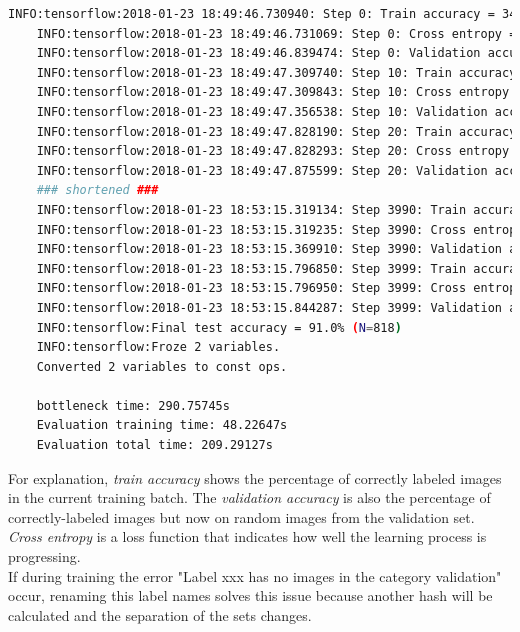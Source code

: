 \begin{minipage}{\linewidth}
\begin{lstlisting}[caption=Output of \textit{retrain.py}, label=list:training_hist, language=bash]
	INFO:tensorflow:2018-01-23 18:49:46.730940: Step 0: Train accuracy = 34.0%
	INFO:tensorflow:2018-01-23 18:49:46.731069: Step 0: Cross entropy = 4.808121
	INFO:tensorflow:2018-01-23 18:49:46.839474: Step 0: Validation accuracy = 4.0% 
	INFO:tensorflow:2018-01-23 18:49:47.309740: Step 10: Train accuracy = 27.0%
	INFO:tensorflow:2018-01-23 18:49:47.309843: Step 10: Cross entropy = 4.646721
	INFO:tensorflow:2018-01-23 18:49:47.356538: Step 10: Validation accuracy = 15.0%
	INFO:tensorflow:2018-01-23 18:49:47.828190: Step 20: Train accuracy = 50.0%
	INFO:tensorflow:2018-01-23 18:49:47.828293: Step 20: Cross entropy = 4.465392
	INFO:tensorflow:2018-01-23 18:49:47.875599: Step 20: Validation accuracy = 32.0%
	### shortened ###
	INFO:tensorflow:2018-01-23 18:53:15.319134: Step 3990: Train accuracy = 91.0%
	INFO:tensorflow:2018-01-23 18:53:15.319235: Step 3990: Cross entropy = 0.282067
	INFO:tensorflow:2018-01-23 18:53:15.369910: Step 3990: Validation accuracy = 89.0%
	INFO:tensorflow:2018-01-23 18:53:15.796850: Step 3999: Train accuracy = 96.0%
	INFO:tensorflow:2018-01-23 18:53:15.796950: Step 3999: Cross entropy = 0.204091
	INFO:tensorflow:2018-01-23 18:53:15.844287: Step 3999: Validation accuracy = 89.0% 
	INFO:tensorflow:Final test accuracy = 91.0% (N=818)
	INFO:tensorflow:Froze 2 variables.
	Converted 2 variables to const ops.
	
	bottleneck time: 290.75745s
	Evaluation training time: 48.22647s
	Evaluation total time: 209.29127s
\end{lstlisting}
\end{minipage}

For explanation, \textit{train accuracy} shows the percentage of correctly labeled images in the current training batch. The \textit{validation accuracy} is also the percentage of correctly-labeled images but now on random images from the validation set. \textit{Cross entropy} is a loss function that indicates how well the learning process is progressing. \citep{TensorFlowRetrain2017}\\

If during training the error "Label xxx has no images in the category validation" occur, renaming this label names solves this issue because another hash will be calculated and the separation of the sets changes. \\

